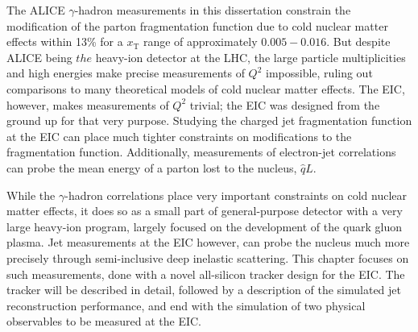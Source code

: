 The ALICE $\gamma$-hadron measurements in this dissertation constrain the modification of the parton fragmentation function due to cold nuclear matter effects within 13\% for a  $x_\mathrm{T}$ range of approximately $0.005-0.016$. But despite ALICE being  $the$ heavy-ion detector at the LHC, the large particle multiplicities and high energies make precise measurements of  $Q^2$ impossible, ruling out comparisons to many theoretical models of cold nuclear matter effects. The EIC, however, makes measurements of $Q^2$ trivial; the EIC was designed from the ground up for that very purpose. Studying the charged jet fragmentation function at the EIC can place much tighter constraints on modifications to the fragmentation function. Additionally, measurements of electron-jet correlations can probe the mean energy of a parton lost to the nucleus, $\hat{q}L$. 

While the $\gamma$-hadron correlations place very important constraints on cold nuclear matter effects, it does so as a small part of general-purpose detector with a very large heavy-ion program, largely focused on the development of the quark gluon plasma. Jet measurements at the EIC however, can probe the nucleus much more precisely through semi-inclusive deep inelastic scattering. This chapter focuses on such measurements, done with a novel all-silicon tracker design for the EIC. The tracker will be described in detail, followed by a description of the simulated jet reconstruction performance, and end with the simulation of two physical observables to be measured at the EIC.

